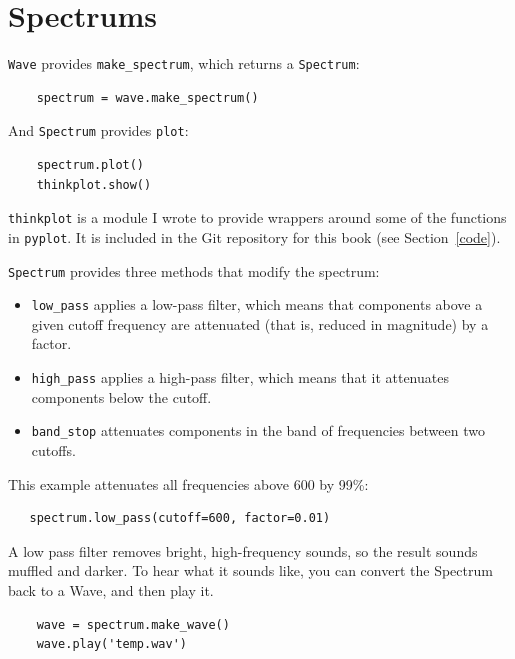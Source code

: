 \documentclass[12pt]{book}
\begin{document}
\section{Spectrums}
\label{spectrums}

{\tt Wave} provides \verb"make_spectrum", which returns a
{\tt Spectrum}:

\begin{verbatim}
    spectrum = wave.make_spectrum()
\end{verbatim}

And {\tt Spectrum} provides {\tt plot}:

\begin{verbatim}
    spectrum.plot()
    thinkplot.show()
\end{verbatim}

{\tt thinkplot} is a module I wrote to provide wrappers around some of
the functions in {\tt pyplot}.  It is included in the
Git repository for this book (see Section~\ref{code}).

{\tt Spectrum} provides three methods that modify the spectrum:

\begin{itemize}

\item \verb"low_pass" applies a low-pass filter, which means that
  components above a given cutoff frequency are attenuated (that is,
  reduced in magnitude) by a factor.

\item \verb"high_pass" applies a high-pass filter, which means that
  it attenuates components below the cutoff.

\item \verb"band_stop" attenuates components in the band of
frequencies between two cutoffs.

\end{itemize}

This example attenuates all frequencies above 600 by 99\%:

\begin{verbatim}
   spectrum.low_pass(cutoff=600, factor=0.01)
\end{verbatim}

A low pass filter removes bright, high-frequency sounds, so
the result sounds muffled and darker.  To hear what it sounds
like, you can convert the Spectrum back to a Wave, and then play it.

\begin{verbatim}
    wave = spectrum.make_wave()
    wave.play('temp.wav')
\end{verbatim}
\end{document}
